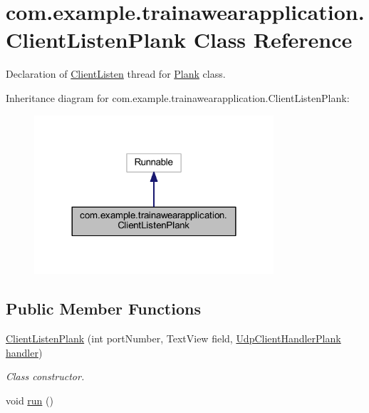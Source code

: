 \hypertarget{classcom_1_1example_1_1trainawearapplication_1_1_client_listen_plank}{}\section{com.\+example.\+trainawearapplication.\+Client\+Listen\+Plank Class Reference}
\label{classcom_1_1example_1_1trainawearapplication_1_1_client_listen_plank}


Declaration of \mbox{\hyperlink{classcom_1_1example_1_1trainawearapplication_1_1_client_listen}{Client\+Listen}} thread for \mbox{\hyperlink{classcom_1_1example_1_1trainawearapplication_1_1_plank}{Plank}} class.  




Inheritance diagram for com.\+example.\+trainawearapplication.\+Client\+Listen\+Plank\+:
\nopagebreak
\begin{figure}[H]
\begin{center}
\leavevmode
\includegraphics[width=252pt]{classcom_1_1example_1_1trainawearapplication_1_1_client_listen_plank__inherit__graph}
\end{center}
\end{figure}
\subsection*{Public Member Functions}
\begin{DoxyCompactItemize}
\item 
\mbox{\hyperlink{classcom_1_1example_1_1trainawearapplication_1_1_client_listen_plank_af1cb478f41c794eaa377a1150009d070}{Client\+Listen\+Plank}} (int port\+Number, Text\+View field, \mbox{\hyperlink{classcom_1_1example_1_1trainawearapplication_1_1_udp_client_handler_plank}{Udp\+Client\+Handler\+Plank}} \mbox{\hyperlink{classcom_1_1example_1_1trainawearapplication_1_1_client_listen_plank_ac90c43ada4fdc1f7865f8ab39865b980}{handler}})
\begin{DoxyCompactList}\small\item\em Class constructor. \end{DoxyCompactList}\item 
void \mbox{\hyperlink{classcom_1_1example_1_1trainawearapplication_1_1_client_listen_plank_adb139f918c79291e8492364927a0b945}{run}} ()
\end{DoxyCompactItemize}
